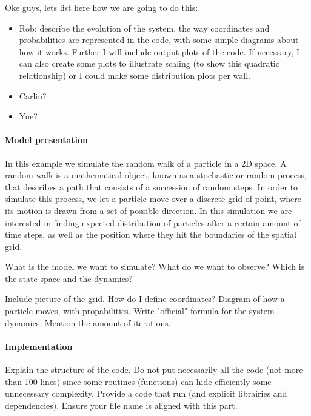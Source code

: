 

Oke guys, lets list here how we are going to do this:
\begin{itemize}
    \item Rob: describe the evolution of the system, the way coordinates and probabilities are represented in the code, with some simple diagrams about how it works. Further I will include output plots of the code. If necessary, I can also create some plots to illustrate scaling (to show this quadratic relationship) or I could make some distribution plots per wall.
    \item Carlin?
    \item Yue?
\end{itemize}

\paragraph{Model presentation}
In this example we simulate the random walk of a particle in a 2D space. A random walk is a mathematical object, known as a stochastic or random process, that describes a path that consists of a succession of random steps. In order to simulate this process, we let a particle move over a discrete grid of point, where its motion is drawn from a set of possible direction. In this simulation we are interested in finding expected distribution of particles after a certain amount of time steps, as well as the position where they hit the boundaries of the spatial grid.


What is the model we want to simulate? What do we want to observe? Which is the state space and the dynamics?

Include picture of the grid. How do I define coordinates?
Diagram of how a particle moves, with propabilities.
Write "official" formula for the system dynamics.
Mention the amount of iterations.

\paragraph{Implementation}
Explain the structure of the code. Do not put necessarily all the code (not more than 100 lines) since some routines (functions) can hide efficiently some unnecessary complexity. Provide a code that run (and explicit librairies and dependencies). Ensure your file name is aligned with this part.

